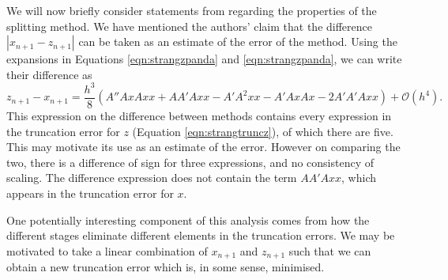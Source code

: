 We will now briefly consider statements from \cite{blanes_pos_2022} regarding the properties of the splitting method.
We have mentioned the authors' claim that the difference $|x_{n+1} - z_{n+1}|$ can be taken as an estimate of the error of the method.
Using the expansions in Equations \ref{eqn:strangzpanda} and \ref{eqn:strangzpanda}, we can write their difference as
\begin{equation}
    z_{n+1} - x_{n+1} = \frac{h^3}{8} \left(
        A'' Ax Ax x + A A' A xx - A' A^2 xx - A' Ax Ax - 2 A' A' A xx
    \right) + \mathcal{O}(h^4).
    \label{eqn:strangdiff}
\end{equation}
This expression on the difference between methods contains every expression in the truncation error for $z$ (Equation \ref{eqn:strangtruncz}), of which there are five.
This may motivate its use as an estimate of the error.
However on comparing the two, there is a difference of sign for three expressions, and no consistency of scaling.
The difference expression does not contain the term $AA'Axx$, which appears in the truncation error for $x$.

One potentially interesting component of this analysis comes from how the different stages eliminate different elements in the truncation errors.
We may be motivated to take a linear combination of $x_{n+1}$ and $z_{n+1}$ such that we can obtain a new truncation error which is, in some sense, minimised.

